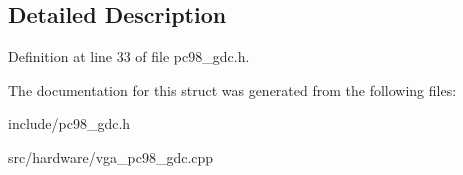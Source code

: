 \subsection{Detailed Description}


Definition at line 33 of file pc98\-\_\-gdc.\-h.



The documentation for this struct was generated from the following files\-:\begin{DoxyCompactItemize}
\item 
include/pc98\-\_\-gdc.\-h\item 
src/hardware/vga\-\_\-pc98\-\_\-gdc.\-cpp\end{DoxyCompactItemize}
